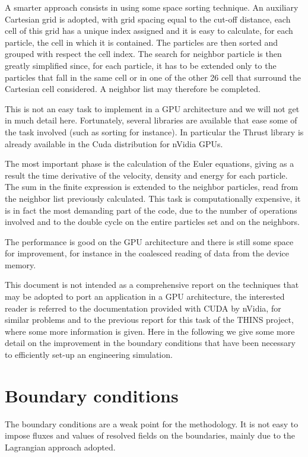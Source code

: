 \documentclass[a4paper, 11pt, twocolumn]{article}
\begin{document}
A smarter approach consists in using some space sorting technique. An auxiliary Cartesian grid is adopted, with grid spacing equal to the cut-off distance, each cell of this grid has a unique index assigned and it is easy to calculate, for each particle, the cell in which it is contained. The particles are then sorted and grouped with respect the cell index. The search for neighbor particle is then greatly simplified since, for each particle, it has to be extended only to the particles that fall in the same cell or in one of the other 26 cell that surround the Cartesian cell considered. A neighbor list may therefore be completed.

This is not an easy task to implement in a GPU architecture and we will not get in much detail here. Fortunately, several libraries are available that ease some of the task involved (such as sorting for instance). In particular the Thrust library is already available in the Cuda distribution for nVidia GPUs.

The most important phase is the calculation of the Euler equations, giving as a result the time derivative of the velocity, density and energy for each particle. The sum in the finite expression is extended to the neighbor particles, read from the neighbor list previously calculated. This task is computationally expensive, it is in fact the most demanding part of the code, due to the number of operations involved and to the double cycle on the entire particles set and on the neighbors.

The performance is good on the GPU architecture and there is still some space for improvement, for instance in the coalesced reading of data from the device memory.

This document is not intended as a comprehensive report on the techniques that may be adopted to port an application in a GPU architecture, the interested reader is referred to the documentation provided with CUDA by nVidia, for similar problems and to the previous report for this task of the THINS project, where some more information is given. Here in the following we give some more detail on the improvement in the boundary conditions that have been necessary to efficiently set-up an engineering simulation.


\section{Boundary conditions}
The boundary conditions are a weak point for the methodology. It is not easy to impose fluxes and values of resolved fields on the boundaries, mainly due to the Lagrangian approach adopted.
\end{document}
